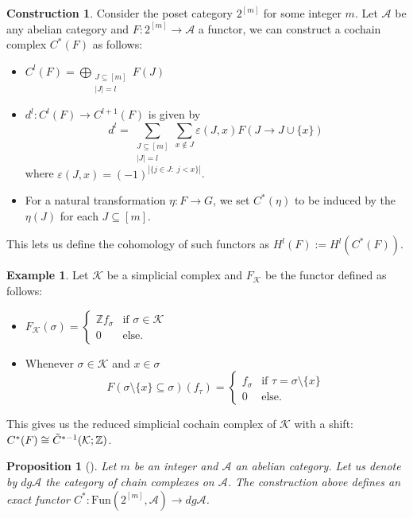 \documentclass[a4paper]{amsart}
\newtheorem{prop}[thm]{Proposition}
\theoremstyle{definition}
\newtheorem{construction}[thm]{Construction}
\newtheorem{exm}[thm]{Example}
\def\Z{\mathbb{Z}}    %
\def\K{\mathcal{K}}
\def\A{\mathcal{A}}
\def\Z{\mathbb{Z}}
\begin{document}
\begin{construction}
Consider the poset category $2^{[m]}$ for some integer $m$. Let $\mathcal{A}$ be any abelian category and $F:2^{[m]}\to \A$ a functor, we can construct a cochain complex $C^*(F)$ as follows:
    \begin{itemize}
        \item  $C^l(F)=\bigoplus\limits_{\substack{J\subseteq[m]\\|J|=l}}F(J)$
        \item $d^l:C^l(F)\to C^{l+1}(F)$ is given by \[d^l=\sum\limits_{\substack{J\subseteq[m]\\|J|=l}}\sum\limits_{x\notin J}{\varepsilon(J,x)}F(J\to J\cup\{x\})\] where $\varepsilon(J,x)=(-1)^{|\{j\in J: \; j<x\}|}$.
        \item For a natural transformation $\eta:F\to G$, we set $C^*(\eta)$ to be induced by the $\eta(J)$ for each $J\subseteq[m]$.
    \end{itemize}
    This lets us define the cohomology of such functors as $H^l(F):=H^l(C^*(F))$.
\end{construction}
\begin{exm}
    Let $\K$ be a simplicial complex and $F_\K$ be the functor defined as follows:
    \begin{itemize}
        \item $F_\K(\sigma)=\left\{\begin{array}{cl}
        \Z f_\sigma &  \text{if $\sigma\in\K$}\\
        0 & \text{else.}
    \end{array}\right.$
        \item Whenever $\sigma\in \K$ and $x\in \sigma$ \[F(\sigma\setminus\{x\}\subseteq\sigma)(f_\tau)=\left\{\begin{array}{cl}
            f_\sigma & \text{if }\tau=\sigma\setminus\{x\} \\
            0 & \text{else.}
        \end{array}\right.\]
    \end{itemize}
    This gives us the reduced simplicial cochain complex of $\K$ with a shift: ~$C^*(F)\cong\Tilde{C}^{*-1}(\K;\Z)$.
\end{exm}
\begin{prop}[{\cite[Prop. 2.7]{ruiz2025doubleuberposethomology}}]
   Let $m$ be an integer and $\A$ an abelian category. Let us denote by $dg\A$ the category of chain complexes on $\A$. The construction above defines an exact functor $C^*:\text{Fun}\left(2^{[m]},\A\right)\to dg\A$. 
\end{prop}
\end{document}
